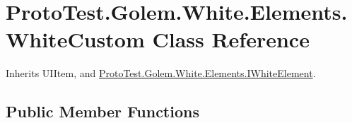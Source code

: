 \hypertarget{class_proto_test_1_1_golem_1_1_white_1_1_elements_1_1_white_custom}{\section{Proto\-Test.\-Golem.\-White.\-Elements.\-White\-Custom Class Reference}
\label{class_proto_test_1_1_golem_1_1_white_1_1_elements_1_1_white_custom}
}


Inherits U\-I\-Item, and \hyperlink{interface_proto_test_1_1_golem_1_1_white_1_1_elements_1_1_i_white_element}{Proto\-Test.\-Golem.\-White.\-Elements.\-I\-White\-Element}.

\subsection*{Public Member Functions}
